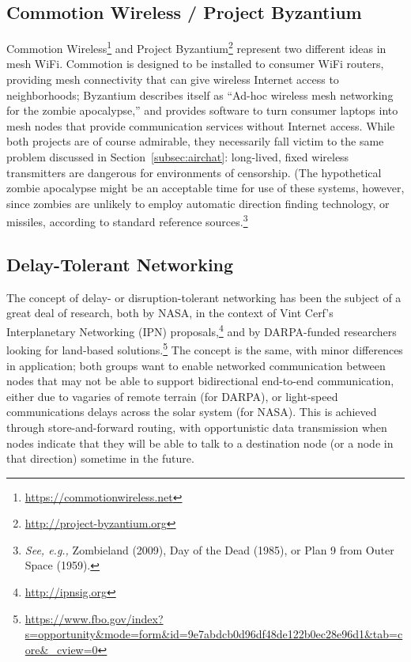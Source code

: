 \documentclass[12pt]{article}
\begin{document}
  \subsection{Commotion Wireless / Project Byzantium}
  
  Commotion Wireless\footnote{\url{https://commotionwireless.net}} and Project Byzantium\footnote{\url{http://project-byzantium.org}} represent two different ideas in mesh WiFi. Commotion is designed to be installed to consumer WiFi routers, providing mesh connectivity that can give wireless Internet access to neighborhoods; Byzantium describes itself as ``Ad-hoc wireless mesh networking for the zombie apocalypse,'' and provides software to turn consumer laptops into mesh nodes that provide communication services without Internet access. While both projects are of course admirable, they necessarily fall victim to the same problem discussed in Section~\ref{subsec:airchat}: long-lived, fixed wireless transmitters are dangerous for environments of censorship. (The hypothetical zombie apocalypse might be an acceptable time for use of these systems, however, since zombies are unlikely to employ automatic direction finding technology, or missiles, according to standard reference sources.\footnote{\emph{See, e.g.,} Zombieland (2009), Day of the Dead (1985), or Plan 9 from Outer Space (1959).}
  
  \subsection{Delay-Tolerant Networking}
  \label{subsec:dtn}
  
  The concept of delay- or disruption-tolerant networking has been the subject of a great deal of research, both by NASA, in the context of Vint Cerf's Interplanetary Networking (IPN) proposals,\footnote{\url{http://ipnsig.org}} and by DARPA-funded researchers looking for land-based solutions.\footnote{\url{https://www.fbo.gov/index?s=opportunity&mode=form&id=9e7abdcb0d96df48de122b0ec28e96d1&tab=core&_cview=0}} The concept is the same, with minor differences in application; both groups want to enable networked communication between nodes that may not be able to support bidirectional end-to-end communication, either due to vagaries of remote terrain (for DARPA), or light-speed communications delays across the solar system (for NASA). This is achieved through store-and-forward routing, with opportunistic data transmission when nodes indicate that they will be able to talk to a destination node (or a node in that direction) sometime in the future.
  
\end{document}
